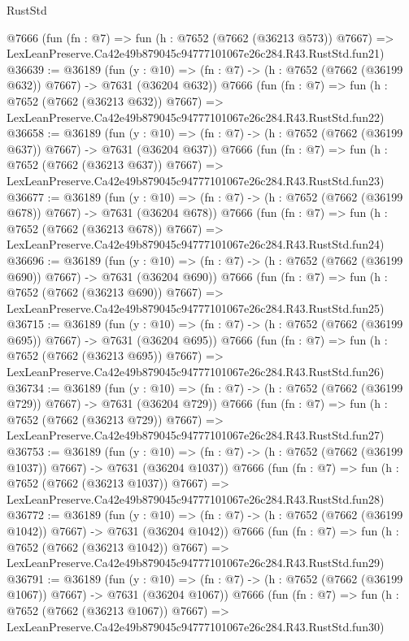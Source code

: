 \begin{lexlean}{RustStd}
\begin{coremodule}
    @7666
    (fun (fn : @7) =>
    fun (h : @7652 (@7662 (@36213 @573)) @7667) =>
    LexLeanPreserve.Ca42e49b879045c94777101067e26c284.R43.RustStd.fun21)
@36639 := @36189
    (fun (y : @10) => (fn : @7) -> (h : @7652 (@7662 (@36199 @632)) @7667) -> @7631 (@36204 @632))
    @7666
    (fun (fn : @7) =>
    fun (h : @7652 (@7662 (@36213 @632)) @7667) =>
    LexLeanPreserve.Ca42e49b879045c94777101067e26c284.R43.RustStd.fun22)
@36658 := @36189
    (fun (y : @10) => (fn : @7) -> (h : @7652 (@7662 (@36199 @637)) @7667) -> @7631 (@36204 @637))
    @7666
    (fun (fn : @7) =>
    fun (h : @7652 (@7662 (@36213 @637)) @7667) =>
    LexLeanPreserve.Ca42e49b879045c94777101067e26c284.R43.RustStd.fun23)
@36677 := @36189
    (fun (y : @10) => (fn : @7) -> (h : @7652 (@7662 (@36199 @678)) @7667) -> @7631 (@36204 @678))
    @7666
    (fun (fn : @7) =>
    fun (h : @7652 (@7662 (@36213 @678)) @7667) =>
    LexLeanPreserve.Ca42e49b879045c94777101067e26c284.R43.RustStd.fun24)
@36696 := @36189
    (fun (y : @10) => (fn : @7) -> (h : @7652 (@7662 (@36199 @690)) @7667) -> @7631 (@36204 @690))
    @7666
    (fun (fn : @7) =>
    fun (h : @7652 (@7662 (@36213 @690)) @7667) =>
    LexLeanPreserve.Ca42e49b879045c94777101067e26c284.R43.RustStd.fun25)
@36715 := @36189
    (fun (y : @10) => (fn : @7) -> (h : @7652 (@7662 (@36199 @695)) @7667) -> @7631 (@36204 @695))
    @7666
    (fun (fn : @7) =>
    fun (h : @7652 (@7662 (@36213 @695)) @7667) =>
    LexLeanPreserve.Ca42e49b879045c94777101067e26c284.R43.RustStd.fun26)
@36734 := @36189
    (fun (y : @10) => (fn : @7) -> (h : @7652 (@7662 (@36199 @729)) @7667) -> @7631 (@36204 @729))
    @7666
    (fun (fn : @7) =>
    fun (h : @7652 (@7662 (@36213 @729)) @7667) =>
    LexLeanPreserve.Ca42e49b879045c94777101067e26c284.R43.RustStd.fun27)
@36753 := @36189
    (fun (y : @10) => (fn : @7) -> (h : @7652 (@7662 (@36199 @1037)) @7667) -> @7631 (@36204 @1037))
    @7666
    (fun (fn : @7) =>
    fun (h : @7652 (@7662 (@36213 @1037)) @7667) =>
    LexLeanPreserve.Ca42e49b879045c94777101067e26c284.R43.RustStd.fun28)
@36772 := @36189
    (fun (y : @10) => (fn : @7) -> (h : @7652 (@7662 (@36199 @1042)) @7667) -> @7631 (@36204 @1042))
    @7666
    (fun (fn : @7) =>
    fun (h : @7652 (@7662 (@36213 @1042)) @7667) =>
    LexLeanPreserve.Ca42e49b879045c94777101067e26c284.R43.RustStd.fun29)
@36791 := @36189
    (fun (y : @10) => (fn : @7) -> (h : @7652 (@7662 (@36199 @1067)) @7667) -> @7631 (@36204 @1067))
    @7666
    (fun (fn : @7) =>
    fun (h : @7652 (@7662 (@36213 @1067)) @7667) =>
    LexLeanPreserve.Ca42e49b879045c94777101067e26c284.R43.RustStd.fun30)

\end{coremodule}
\end{lexlean}
